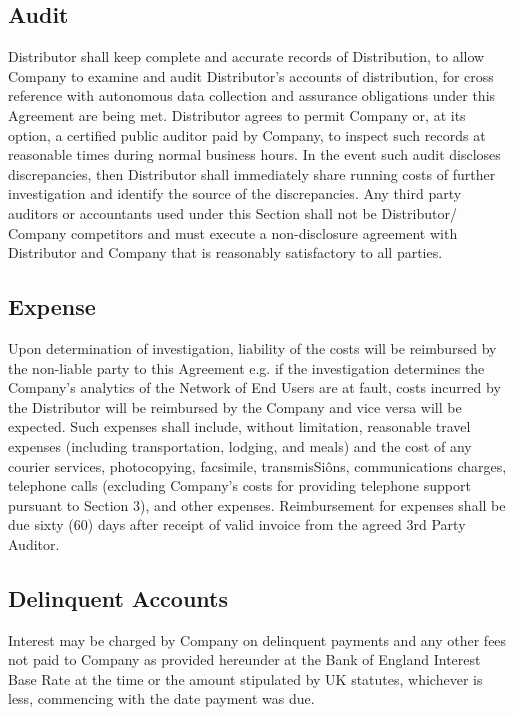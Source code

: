 \documentclass[letterpaper,10pt,english]{sphinxmanual}
\begin{document}
\subsection{Audit}
\label{\detokenize{licencefees:audit}}
Distributor shall keep complete and accurate records of Distribution, to allow Company to examine and audit Distributor’s accounts of distribution, for cross reference with autonomous data collection and assurance obligations under this Agreement are being met. Distributor agrees to permit Company or, at its option, a certified public auditor paid by Company, to inspect such records at reasonable times during normal business hours. In the event such audit discloses discrepancies, then Distributor shall immediately share running costs of further investigation and identify the source of the discrepancies. Any third party auditors or accountants used under this Section shall not be Distributor/ Company competitors and must execute a non-disclosure agreement with Distributor and Company that is reasonably satisfactory to all parties.


\subsection{Expense}
\label{\detokenize{licencefees:expense}}
Upon determination of investigation, liability of the costs will be reimbursed by the non-liable party to this Agreement e.g. if the investigation determines the Company’s analytics of the Network of End Users are at fault, costs incurred by the Distributor will be reimbursed by the Company and vice versa will be expected. Such expenses shall include, without limitation, reasonable travel expenses (including transportation, lodging, and meals) and the cost of any courier services, photocopying, facsimile, transmisSiôns, communications charges, telephone calls (excluding Company’s costs for providing telephone support pursuant to Section 3), and other expenses.  Reimbursement for expenses shall be due sixty (60) days after receipt of valid invoice from the agreed 3rd Party Auditor.


\subsection{Delinquent Accounts}
\label{\detokenize{licencefees:delinquent-accounts}}
Interest may be charged by Company on delinquent payments and any other fees not paid to Company as provided hereunder at the Bank of England Interest Base Rate at the time or the amount stipulated by UK statutes, whichever is less, commencing with the date payment was due.
\end{document}
